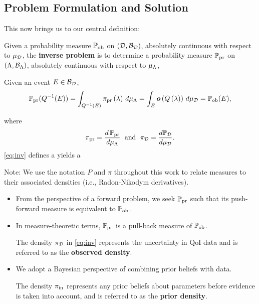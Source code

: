 \subsection{Problem Formulation and Solution}
\begin{frame}[t]
This now brings us to our central definition:

\begin{defn}\label{defn:consistency}
Given a probability measure $\operatorname*{\mathbb{P}_{ob}}$ on $(\mathcal{D}, \mathcal{B}_{\mathcal{D}})$, absolutely continuous with respect to $\mu_{\mathcal{D}}$, the \textbf{inverse problem} is to determine a probability measure $\operatorname*{\mathbb{P}_{pr}}$ on $({\Lambda}, \mathcal{B}_{{\Lambda}})$, absolutely continuous with respect to $\mu_{\Lambda}$, 

Given an event $E \in \mathcal{B}_{\mathcal{D}}$,
\begin{equation}\label{eq:inv}
\operatorname*{\mathbb{P}_{pr}}(Q^{-1}(E)) = \int_{Q^{-1}(E)} \operatorname*{\pi_{pr}} \left ( \lambda \right ) \, d\mu_{\Lambda} = \int_E \operatorname*{\boldsymbol{o}} \left ( Q\left ( \lambda \right ) \right ) \, d\mu_{\mathcal{D}} = \operatorname*{\mathbb{P}_{ob}}(E),
\end{equation} 

where 
\begin{equation*}
\operatorname*{\pi_{pr}} = \frac{d\operatorname*{\mathbb{P}_{pr}}}{d\mu_{\Lambda}} \;\text{ and }\; \pi_{\mathcal{D}} = \frac{d\mathbb{P}_{\mathcal{D}}}{d\mu_{\mathcal{D}}}.
\end{equation*}
\eqref{eq:inv} defines a  yields a 
\end{defn}

Note: {\scriptsize We use the notation $P$ and $\pi$ throughout this work to relate measures to their associated densities (i.e., Radon-Nikodym derivatives).}
\end{frame}


\begin{frame}[t]
\begin{itemize}
	\item <1-> From the perspective of a forward problem, we seek $\operatorname*{\mathbb{P}_{pr}}$ such that its push-forward measure is equivalent to $\operatorname*{\mathbb{P}_{ob}}$. 
	
	\item <2-> In measure-theoretic terms, $\operatorname*{\mathbb{P}_{pr}}$ is a pull-back measure of $\operatorname*{\mathbb{P}_{ob}}$.
	\begin{defn}\label{defn:obsden}
The density $\pi_{\mathcal{D}}$ in \eqref{eq:inv} represents the uncertainty in QoI data and is referred to as the \textbf{observed density}.
\end{defn}

	\item <3-> We adopt a Bayesian perspective of combining prior beliefs with data. 
	\begin{defn}\label{defn:priorden}
The density $\operatorname*{\pi_{in}}$ represents any prior beliefs about parameters before evidence is taken into account, and is referred to as the \textbf{prior density}.
\end{defn}

\end{itemize}

\end{frame}

